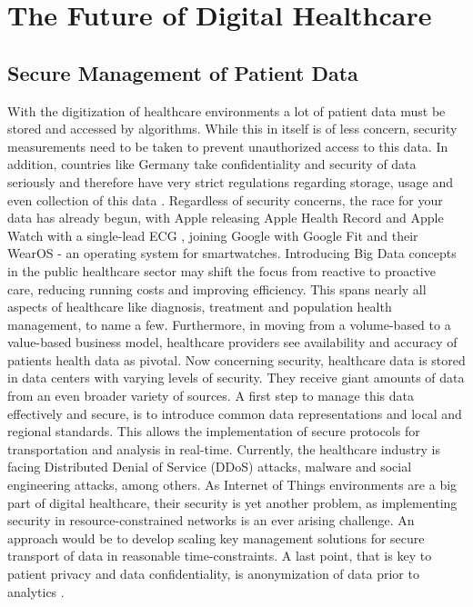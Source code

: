 \section{The Future of Digital Healthcare}
\subsection{Secure Management of Patient Data}
With the digitization of healthcare environments a lot of patient data must be stored and accessed by algorithms. While this in itself is of less concern, security measurements need to be taken to prevent unauthorized access to this data. In addition, countries like Germany take confidentiality and security of data seriously and therefore have very strict regulations regarding storage, usage and even collection of this data \cite{dsgvo}. Regardless of security concerns, the race for your data has already begun, with Apple releasing Apple Health Record and Apple Watch with a single-lead ECG \cite{appleHealth}, joining Google with Google Fit and their WearOS - an operating system for smartwatches. Introducing Big Data concepts in the public healthcare sector may shift the focus from reactive to proactive care, reducing running costs and improving efficiency. This spans nearly all aspects of healthcare like diagnosis, treatment and population health management, to name a few. Furthermore, in moving from a volume-based to a value-based business model, healthcare providers see availability and accuracy of patients health data as pivotal. Now concerning security, healthcare data is stored in data centers with varying levels of security. They receive giant amounts of data from an even broader variety of sources. A first step to manage this data effectively and secure, is to introduce common data representations and local and regional standards. This allows the implementation of secure protocols for transportation and analysis in real-time. Currently, the healthcare industry is facing Distributed Denial of Service (DDoS) attacks, malware and social engineering attacks, among others. As Internet of Things environments are a big part of digital healthcare, their security is yet another problem, as implementing security in resource-constrained networks is an ever arising challenge. An approach would be to develop scaling key management solutions for secure transport of data in reasonable time-constraints. A last point, that is key to patient privacy and data confidentiality, is anonymization of data prior to analytics \cite{patil2014big}.
